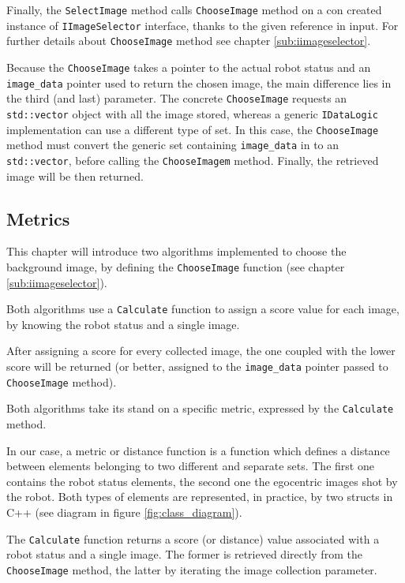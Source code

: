%
Finally, the \texttt{SelectImage} method calls \texttt{ChooseImage} method on a con created instance
of \texttt{IImageSelector} interface, thanks to the given reference in input. For further details
about \texttt{ChooseImage} method see chapter \ref{sub:iimageselector}.
%

%
Because the \texttt{ChooseImage} takes a pointer to the actual robot status and an
\texttt{image\_data} pointer used to return the chosen image, the main difference lies in the third (and last)
parameter. The concrete \texttt{ChooseImage} requests an \texttt{std::vector} object with all the image stored,
whereas a generic \texttt{IDataLogic} implementation can use a different type of set. In this case, the
\texttt{ChooseImage} method must convert the generic set containing \texttt{image\_data} in to an \texttt{std::vector},
before calling the \texttt{ChooseImagem} method. Finally, the retrieved image will be then returned.
%



\subsection{Metrics}
\label{sub:metrics}

This chapter will introduce two algorithms implemented to choose the
background image, by defining the \texttt{ChooseImage} function (see
chapter \ref{sub:iimageselector}).

%

%
Both algorithms use a \texttt{Calculate} function to assign a score
value for each image, by knowing the robot status and a single image.
%

%
After assigning a score for every collected image, the one coupled with the
lower score will be returned (or better, assigned to the \texttt{image\_data}
pointer passed to \texttt{ChooseImage} method).
%

%
Both algorithms take its stand on a specific metric, expressed by the \texttt{Calculate}
method.
%

%
In our case, a metric or distance function is a function which defines a
distance between elements belonging to two different and separate sets. The
first one contains the robot status elements, the second one the egocentric images
shot by the robot. Both types of elements are represented, in practice, by two structs
in C++ (see diagram in figure \ref{fig:class_diagram}).
%

%
The \texttt{Calculate} function returns a score (or distance) value associated with a robot
status and a single image. The former is retrieved directly from the \texttt{ChooseImage} 
method, the latter by iterating the image collection parameter.
%

